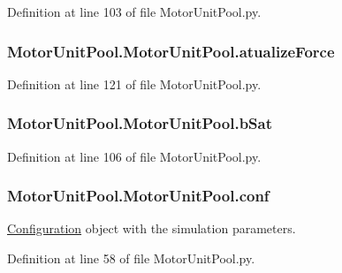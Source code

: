 Definition at line 103 of file Motor\-Unit\-Pool.\-py.

\hypertarget{class_motor_unit_pool_1_1_motor_unit_pool_a21f9a6a5d113b5b0f67a3557c47ebd5a}{
\subsubsection[{atualize\-Force}]{\setlength{\rightskip}{0pt plus 5cm}Motor\-Unit\-Pool.\-Motor\-Unit\-Pool.\-atualize\-Force}}\label{class_motor_unit_pool_1_1_motor_unit_pool_a21f9a6a5d113b5b0f67a3557c47ebd5a}


Definition at line 121 of file Motor\-Unit\-Pool.\-py.

\hypertarget{class_motor_unit_pool_1_1_motor_unit_pool_a4e107835e34b4f56d06b9b28c143fe40}{
\subsubsection[{b\-Sat}]{\setlength{\rightskip}{0pt plus 5cm}Motor\-Unit\-Pool.\-Motor\-Unit\-Pool.\-b\-Sat}}\label{class_motor_unit_pool_1_1_motor_unit_pool_a4e107835e34b4f56d06b9b28c143fe40}


Definition at line 106 of file Motor\-Unit\-Pool.\-py.

\hypertarget{class_motor_unit_pool_1_1_motor_unit_pool_a3b2ee8f3e5500bfdc8fa731a5cb7d622}{
\subsubsection[{conf}]{\setlength{\rightskip}{0pt plus 5cm}Motor\-Unit\-Pool.\-Motor\-Unit\-Pool.\-conf}}\label{class_motor_unit_pool_1_1_motor_unit_pool_a3b2ee8f3e5500bfdc8fa731a5cb7d622}


\hyperlink{namespace_configuration}{Configuration} object with the simulation parameters. 



Definition at line 58 of file Motor\-Unit\-Pool.\-py.

